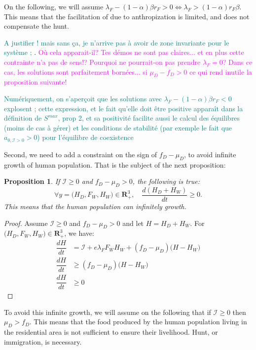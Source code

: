 \documentclass{article}
\newcommand{\lfw}{\lambda_{F}}
\newcommand{\lfw}{\lambda_{F}}
\newcommand{\cI}{\mathcal{I}}
\newcommand{\marc}[1]{\textcolor{teal}{#1}}
\newcommand{\YD}[1]{\textcolor{magenta}{#1}}
\newtheorem{prop}{Proposition}
\begin{document}
On the following, we will assume $\lfw - (1-\alpha) \beta r_F > 0 \Leftrightarrow \lfw > (1-\alpha) r_F \beta$. This means that the facilitation of due to anthropization is limited, and does not compensate the hunt.  



\marc{A justifier ! mais sans ça, je n'arrive pas à avoir de zone invariante pour le système ; }. \YD{Où cela apparait-il? Tes démos ne sont pas claires... et en plus cette contrainte n'a pas de sens!? Pourquoi ne pourrait-on pas prendre $\lfw=0$? Dans ce cas, les solutions sont parfaitement bornées... si $\mu_D-f_D>0$ ce qui rend inutile la proposition suivante!}

\marc{Numériquement, on s'aperçoit que les solutions avec $\lfw - (1-\alpha) \beta r_F < 0$ explosent ; 
cette expression, et le fait qu'elle doit être positive apparaît dans la définition de $S^{max}$, prop 2, et sa positivité facilite aussi le calcul des équilibres (moins de cas à gérer)
et les conditions de stabilité (par exemple le fait que $a_{0, \cI > 0} > 0$) pour l'équilibre de coexistence}

Second, we need to add a constraint on the sign of $f_D - \mu_D$, to avoid infinite growth of human population. That is the subject of the next proposition:

\begin{prop}
If $\cI \geq 0$ and $f_D - \mu_D > 0$, the following is true:
$$
\forall	y=\Big(H_D, F_W, H_W\Big) \in \mathbf{R}^3_+, \quad \dfrac{d(H_D + H_W)}{dt} \geq 0.
$$
This means that the human population can infinitely growth.
\end{prop}

\begin{proof}
Assume $\cI \geq 0$ and $f_D - \mu_D > 0$ and let $H = H_D + H_W$. For $\Big(H_D, F_W, H_W\Big) \in \mathbf{R}^3_+$, we have:
\begin{align*}
\dfrac{dH}{dt} &= \cI + e \lfw F_W H_W + (f_D - \mu_D) \Big(H - H_W \Big) \\
\dfrac{dH}{dt} & \geq (f_D - \mu_D) \Big(H - H_W \Big) \\
\dfrac{dH}{dt} & \geq 0
\end{align*}
\end{proof}

To avoid this infinite growth, we will assume on the following that if $\cI \geq 0$ then $\mu_D > f_D$. This means that the food produced by the human population living in the residential area is not sufficient to ensure their livelihood. Hunt, or immigration, is necessary. 
\end{document}
